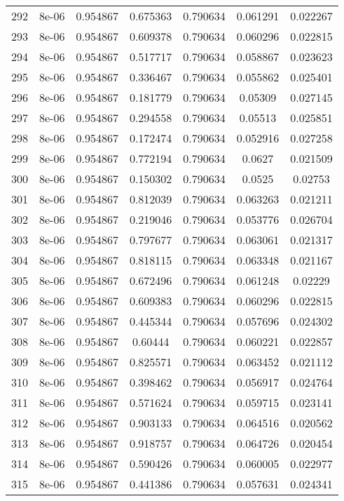 \begin{table}
\begin{tabular*}{\linewidth}{c|c|c|c|c|c|c}
292 & 8e-06 & 0.954867 & 0.675363 & 0.790634 & 0.061291 & 0.022267\\
293 & 8e-06 & 0.954867 & 0.609378 & 0.790634 & 0.060296 & 0.022815\\
294 & 8e-06 & 0.954867 & 0.517717 & 0.790634 & 0.058867 & 0.023623\\
295 & 8e-06 & 0.954867 & 0.336467 & 0.790634 & 0.055862 & 0.025401\\
296 & 8e-06 & 0.954867 & 0.181779 & 0.790634 & 0.05309 & 0.027145\\
297 & 8e-06 & 0.954867 & 0.294558 & 0.790634 & 0.05513 & 0.025851\\
298 & 8e-06 & 0.954867 & 0.172474 & 0.790634 & 0.052916 & 0.027258\\
299 & 8e-06 & 0.954867 & 0.772194 & 0.790634 & 0.0627 & 0.021509\\
300 & 8e-06 & 0.954867 & 0.150302 & 0.790634 & 0.0525 & 0.02753\\
301 & 8e-06 & 0.954867 & 0.812039 & 0.790634 & 0.063263 & 0.021211\\
302 & 8e-06 & 0.954867 & 0.219046 & 0.790634 & 0.053776 & 0.026704\\
303 & 8e-06 & 0.954867 & 0.797677 & 0.790634 & 0.063061 & 0.021317\\
304 & 8e-06 & 0.954867 & 0.818115 & 0.790634 & 0.063348 & 0.021167\\
305 & 8e-06 & 0.954867 & 0.672496 & 0.790634 & 0.061248 & 0.02229\\
306 & 8e-06 & 0.954867 & 0.609383 & 0.790634 & 0.060296 & 0.022815\\
307 & 8e-06 & 0.954867 & 0.445344 & 0.790634 & 0.057696 & 0.024302\\
308 & 8e-06 & 0.954867 & 0.60444 & 0.790634 & 0.060221 & 0.022857\\
309 & 8e-06 & 0.954867 & 0.825571 & 0.790634 & 0.063452 & 0.021112\\
310 & 8e-06 & 0.954867 & 0.398462 & 0.790634 & 0.056917 & 0.024764\\
311 & 8e-06 & 0.954867 & 0.571624 & 0.790634 & 0.059715 & 0.023141\\
312 & 8e-06 & 0.954867 & 0.903133 & 0.790634 & 0.064516 & 0.020562\\
313 & 8e-06 & 0.954867 & 0.918757 & 0.790634 & 0.064726 & 0.020454\\
314 & 8e-06 & 0.954867 & 0.590426 & 0.790634 & 0.060005 & 0.022977\\
315 & 8e-06 & 0.954867 & 0.441386 & 0.790634 & 0.057631 & 0.024341\\
\end{tabular*}
\end{table}
